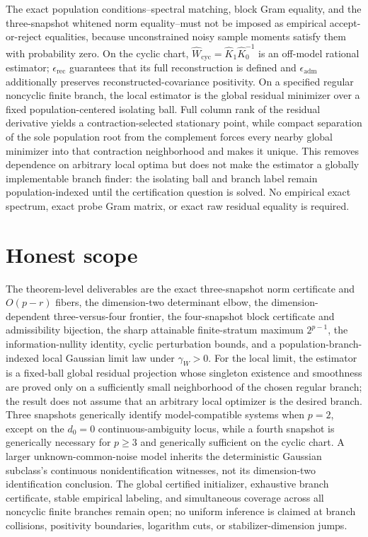 \documentclass{article}
\begin{document}
The exact population conditions--spectral matching, block Gram equality, and the three-snapshot whitened norm equality--must not be imposed as empirical accept-or-reject equalities, because unconstrained noisy sample moments satisfy them with probability zero.  On the cyclic chart, \(\widehat W_{\mathrm{cyc}}=\widehat K_1\widehat K_0^{-1}\) is an off-model rational estimator; \(\epsilon_{\mathrm{rec}}\) guarantees that its full reconstruction is defined and \(\epsilon_{\mathrm{adm}}\) additionally preserves reconstructed-covariance positivity.  On a specified regular noncyclic finite branch, the local estimator is the global residual minimizer over a fixed population-centered isolating ball.  Full column rank of the residual derivative yields a contraction-selected stationary point, while compact separation of the sole population root from the complement forces every nearby global minimizer into that contraction neighborhood and makes it unique.  This removes dependence on arbitrary local optima but does not make the estimator a globally implementable branch finder: the isolating ball and branch label remain population-indexed until the certification question is solved.  No empirical exact spectrum, exact probe Gram matrix, or exact raw residual equality is required.

\section{Honest scope}

The theorem-level deliverables are the exact three-snapshot norm certificate and \(O(p-r)\) fibers, the dimension-two determinant elbow, the dimension-dependent three-versus-four frontier, the four-snapshot block certificate and admissibility bijection, the sharp attainable finite-stratum maximum \(2^{p-1}\), the information-nullity identity, cyclic perturbation bounds, and a population-branch-indexed local Gaussian limit law under \(\gamma_W>0\).  For the local limit, the estimator is a fixed-ball global residual projection whose singleton existence and smoothness are proved only on a sufficiently small neighborhood of the chosen regular branch; the result does not assume that an arbitrary local optimizer is the desired branch.  Three snapshots generically identify model-compatible systems when \(p=2\), except on the \(d_0=0\) continuous-ambiguity locus, while a fourth snapshot is generically necessary for \(p\ge3\) and generically sufficient on the cyclic chart.  A larger unknown-common-noise model inherits the deterministic Gaussian subclass's continuous nonidentification witnesses, not its dimension-two identification conclusion.  The global certified initializer, exhaustive branch certificate, stable empirical labeling, and simultaneous coverage across all noncyclic finite branches remain open; no uniform inference is claimed at branch collisions, positivity boundaries, logarithm cuts, or stabilizer-dimension jumps.
\end{document}
